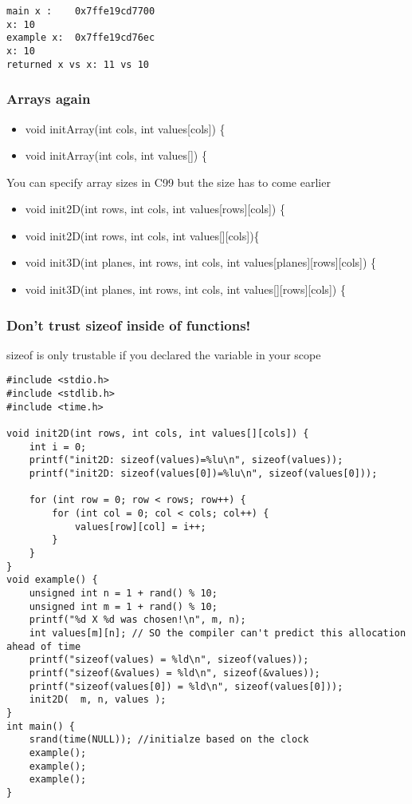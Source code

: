 \documentclass[11pt]{article}
\begin{document}
\begin{verbatim}
main x :	0x7ffe19cd7700
x: 10
example x:	0x7ffe19cd76ec
x: 10
returned x vs x: 11 vs 10
\end{verbatim}

\subsubsection{Arrays again}
\label{sec:org3a5478a}

\begin{itemize}
\item void initArray(int cols, int values[cols]) \{
\item void initArray(int cols, int values[]) \{
\end{itemize}

You can specify array sizes in C99 but the size has to come earlier

\begin{itemize}
\item void init2D(int rows, int cols, int values[rows][cols]) \{
\item void init2D(int rows, int cols, int values[][cols])\{
\item void init3D(int planes, int rows, int cols, int values[planes][rows][cols]) \{
\item void init3D(int planes, int rows, int cols, int values[][rows][cols]) \{
\end{itemize}


\subsubsection{Don't trust sizeof inside of functions!}
\label{sec:org222cf4c}

sizeof is only trustable if you declared the variable in your scope

\begin{verbatim}
#include <stdio.h>
#include <stdlib.h>
#include <time.h>

void init2D(int rows, int cols, int values[][cols]) {
    int i = 0;
    printf("init2D: sizeof(values)=%lu\n", sizeof(values));
    printf("init2D: sizeof(values[0])=%lu\n", sizeof(values[0]));

    for (int row = 0; row < rows; row++) {
        for (int col = 0; col < cols; col++) {
            values[row][col] = i++;
        }
    }
}
void example() {
    unsigned int n = 1 + rand() % 10;
    unsigned int m = 1 + rand() % 10;
    printf("%d X %d was chosen!\n", m, n);
    int values[m][n]; // SO the compiler can't predict this allocation ahead of time
    printf("sizeof(values) = %ld\n", sizeof(values));
    printf("sizeof(&values) = %ld\n", sizeof(&values));
    printf("sizeof(values[0]) = %ld\n", sizeof(values[0]));
    init2D(  m, n, values );
}
int main() {
    srand(time(NULL)); //initialze based on the clock 
    example();
    example();
    example();
}
\end{verbatim}
\end{document}
